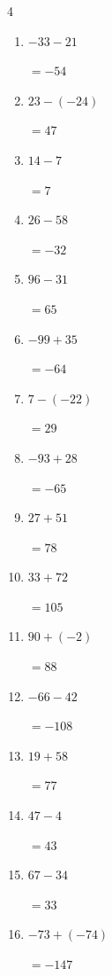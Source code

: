 \begin{multicols}{4}
\begin{enumerate}
        $=11$

  \item $-33-21$

        $=-54$

  \item $23-(-24)$

        $=47$

  \item $14-7$

        $=7$

  \item $26-58$

        $=-32$

  \item $96-31$

        $=65$

  \item $-99+35$

        $=-64$

  \item $7-(-22)$

        $=29$

  \item $-93+28$

        $=-65$

\columnbreak %

\resetques

  \item $27+51$

        $=78$

  \item $33+72$

        $=105$

  \item $90+(-2)$

        $=88$

  \item $-66-42$

        $=-108$

  \item $19+58$

        $=77$

  \item $47-4$

        $=43$

  \item $67-34$

        $=33$

  \item $-73+(-74)$

        $=-147$


\end{enumerate}
\end{multicols}
